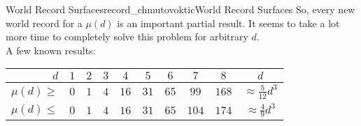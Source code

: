\begin{surferIntroPage}{World Record Surfaces}{record_chmutovoktic}{World Record Surfaces}
    So, every new world record for a $\mu(d)$ is an important partial result. It seems to take a lot more time to completely solve this problem for arbitrary $d$.\\  A few known results:
    
   \begin{center}
      \begin{tabular}{r|cccccccc|c}
        $d$ & $1$ & $2$ & $3$ & $4$ & $5$ & $6$ & $7$ & $8$ & $d$\\
        \hline
        \hline
        \rule{0pt}{1.2em}$\mu(d)\ge$ & $0$ & $1$ & $4$ & $16$ & $31$ & $65$ &
        $99$ & $168$ & 
        $\approx \frac{5}{12}d^3$\\[0.3em]
        \hline
        \rule{0pt}{1.2em}$\mu(d)\le$ & $0$ & $1$ & $4$ & $16$ & $31$ & $65$ &
        $104$ & $174$ & $\approx \frac{4}{9}d^3$
      \end{tabular}
    \end{center}
\end{surferIntroPage}
